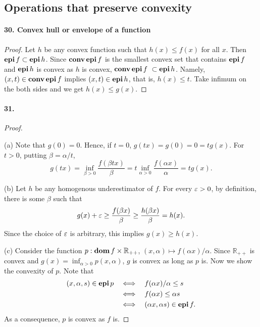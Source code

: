 \subsection{Operations that preserve convexity}
  \paragraph{30. Convex hull or envelope of a function}
  \begin{proof}
    Let $h$ be any convex function such that $h(x)\le f(x)$ for all $x$. Then
    $\operatorname{\mathbf{epi}} f\subset\operatorname{\mathbf{epi}} h$. Since $\operatorname{\mathbf{conv}}\operatorname{\mathbf{epi}} f$ is the smallest convex set that
    contains $\operatorname{\mathbf{epi}} f$ and $\operatorname{\mathbf{epi}} h$ is convex as $h$ is convex, $\operatorname{\mathbf{conv}}\operatorname{\mathbf{epi}} f\
    \subset\operatorname{\mathbf{epi}} h$. Namely, $(x,t)\in\operatorname{\mathbf{conv}}\operatorname{\mathbf{epi}} f$ implies $(x,t)\in\operatorname{\mathbf{epi}} h$, that
    is, $h(x)\le t$. Take infimum on the both sides and we get $h(x)\le g(x)$.
  \end{proof}
  
  \paragraph{31.}
  \begin{proof}
    $\,$\par
    (a) Note that $g(0)=0$. Hence, if $t=0$, $g(tx)=g(0)=0=tg(x)$. For $t>0$, 
    putting $\beta=\alpha/t$, 
    \[
      g(tx)=\inf_{\beta>0}\frac{f(\beta tx)}{\beta}=
      t\inf_{\alpha>0}\frac{f(\alpha x)}{\alpha}=tg(x).
    \]\par
    (b) Let $h$ be any homogenous underestimator of $f$. For every $\varepsilon>0$, by
    definition, there is some $\beta$ such that
    \[
      g(x)+\varepsilon\ge\frac{f(\beta x)}{\beta}\ge \frac{h(\beta x)}{\beta}=h(x).
    \]
    Since the choice of $\varepsilon$ is arbitrary, this implies $g(x)\ge h(x)$.\par
    (c) Consider the function $p:\operatorname{\mathbf{dom}} f\times\mathbb{R}_{++}$, $(x,\alpha)
    \mapsto f(\alpha x)/\alpha$. Since $\mathbb{R}_{++}$ is convex and $g(x)=
    \inf_{\alpha>0}p(x,\alpha)$, $g$ is convex as long as $p$ is. Now we show
    the convexity of $p$. Note that
    \begin{align*}
      (x,\alpha,s)\in\operatorname{\mathbf{epi}} p 
      &\quad\Longleftrightarrow\quad f(\alpha x)/\alpha\le s \\
      &\quad\Longleftrightarrow\quad f(\alpha x)\le \alpha s \\
      &\quad\Longleftrightarrow\quad (\alpha x,\alpha s)\in\operatorname{\mathbf{epi}} f.
    \end{align*}
    As a consequence, $p$ is convex as $f$ is.
  \end{proof}
